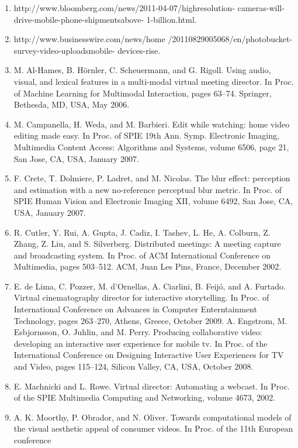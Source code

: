 \documentclass{sig-alternate}
\begin{document}
{{{\begin{enumerate}
    \item http://www.bloomberg.com/news/2011-04-07/highresolution-
cameras-will-drive-mobile-phone-shipmentsabove-
1-billion.html.
   \item http://www.businesswire.com/news/home
/20110829005068/en/photobucket-survey-video-uploadsmobile-
devices-rise.
   \item M. Al-Hames, B. Hörnler, C. Scheuermann, and G. Rigoll.
Using audio, visual, and lexical features in a multi-modal
virtual meeting director. In Proc. of Machine Learning for
Multimodal Interaction, pages 63–74. Springer, Bethesda,
MD, USA, May 2006.
   \item M. Campanella, H. Weda, and M. Barbieri. Edit while
watching: home video editing made easy. In Proc. of SPIE
19th Ann. Symp. Electronic Imaging, Multimedia Content
Access: Algorithms and Systems, volume 6506, page 21, San
Jose, CA, USA, January 2007.
   \item F. Crete, T. Dolmiere, P. Ladret, and M. Nicolas. The blur
effect: perception and estimation with a new no-reference
perceptual blur metric. In Proc. of SPIE Human Vision and
Electronic Imaging XII, volume 6492, San Jose, CA, USA,
January 2007.
   \item R. Cutler, Y. Rui, A. Gupta, J. Cadiz, I. Tashev, L. He,
A. Colburn, Z. Zhang, Z. Liu, and S. Silverberg. Distributed
meetings: A meeting capture and broadcasting system. In
Proc. of ACM International Conference on Multimedia,
pages 503–512. ACM, Juan Les Pins, France, December
2002.
    \item E. de Lima, C. Pozzer, M. d’Ornellas, A. Ciarlini, B. Feijó,
and A. Furtado. Virtual cinematography director for
interactive storytelling. In Proc. of International Conference
on Advances in Computer Enterntainment Technology, pages
263–270, Athens, Greece, October 2009.
A. Engstrom, M. Esbjornsson, O. Juhlin, and M. Perry.
Producing collaborative video: developing an interactive user
experience for mobile tv. In Proc. of the International
Conference on Designing Interactive User Experiences for
TV and Video, pages 115–124, Silicon Valley, CA, USA,
October 2008.
   \item E. Machnicki and L. Rowe. Virtual director: Automating a
webcast. In Proc. of the SPIE Multimedia Computing and
Networking, volume 4673, 2002.
   \item A. K. Moorthy, P. Obrador, and N. Oliver. Towards
computational models of the visual aesthetic appeal of
consumer videos. In Proc. of the 11th European conference

\end{enumerate}}}}
\end{document}
